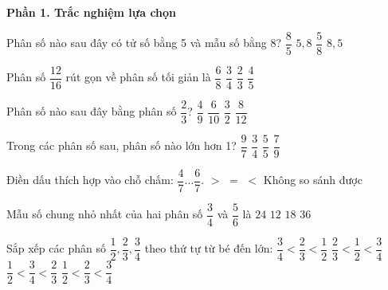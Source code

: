 \textbf{Phần 1. Trắc nghiệm lựa chọn}

\begin{ex} %
Phân số nào sau đây có tử số bằng 5 và mẫu số bằng 8?
\choice
{$\dfrac{8}{5}$}
{$5{,}8$}
{\True $\dfrac{5}{8}$}
{$8{,}5$}
\end{ex}

\begin{ex} %
Phân số $\dfrac{12}{16}$ rút gọn về phân số tối giản là
\choice
{$\dfrac{6}{8}$}
{\True $\dfrac{3}{4}$}
{$\dfrac{2}{3}$}
{$\dfrac{4}{5}$}
\end{ex}

\begin{ex} %
Phân số nào sau đây bằng phân số $\dfrac{2}{3}$?
\choice
{$\dfrac{4}{9}$}
{$\dfrac{6}{10}$}
{$\dfrac{3}{2}$}
{\True $\dfrac{8}{12}$}
\end{ex}

\begin{ex} %
Trong các phân số sau, phân số nào lớn hơn 1?
\choice
{\True $\dfrac{9}{7}$}
{$\dfrac{3}{4}$}
{$\dfrac{5}{5}$}
{$\dfrac{7}{9}$}
\end{ex}

\begin{ex} %
Điền dấu thích hợp vào chỗ chấm: $\dfrac{4}{7} \dots \dfrac{6}{7}$.
\choice
{$>$}
{$=$}
{\True $<$}
{Không so sánh được}
\end{ex}

\begin{ex} %
Mẫu số chung nhỏ nhất của hai phân số $\dfrac{3}{4}$ và $\dfrac{5}{6}$ là
\choice
{$24$}
{\True $12$}
{$18$}
{$36$}
\end{ex}

\begin{ex} %
Sắp xếp các phân số $\dfrac{1}{2}, \dfrac{2}{3}, \dfrac{3}{4}$ theo thứ tự từ bé đến lớn:
\choice
{$\dfrac{3}{4} < \dfrac{2}{3} < \dfrac{1}{2}$}
{$\dfrac{2}{3} < \dfrac{1}{2} < \dfrac{3}{4}$}
{$\dfrac{1}{2} < \dfrac{3}{4} < \dfrac{2}{3}$}
{\True $\dfrac{1}{2} < \dfrac{2}{3} < \dfrac{3}{4}$}
\end{ex}

